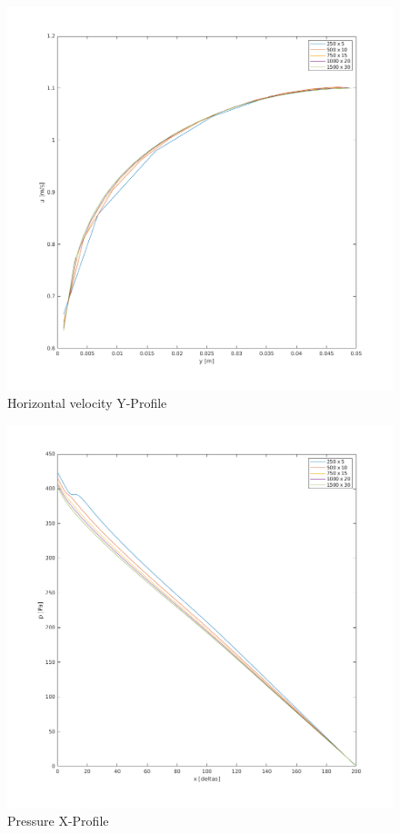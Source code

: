 \documentclass[12pt]{article}
\begin{document}
        \begin{figure}[ht!]
                \centering
                \includegraphics[width=\textwidth]{U_Independence.png}
                \caption{Horizontal velocity Y-Profile}
                \label{fig:U_Ind}
        \end{figure}

        \begin{figure}[ht!]
                \centering
                \includegraphics[width=\textwidth]{P_Independence.png}
                \caption{Pressure X-Profile}
                \label{fig:P_Ind}
        \end{figure}
\end{document}

